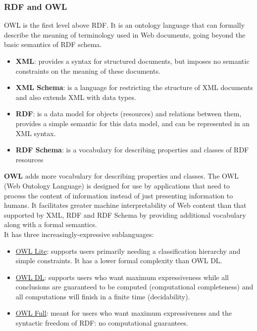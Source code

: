 \documentclass[10pt,a4paper]{article}
\begin{document}
\subsubsection{RDF and OWL}
OWL is the first level above RDF. It is an ontology language that can formally describe the meaning of terminology used in Web documents, going beyond the basic semantics of RDF schema.
\begin{itemize}
	\item \textbf{XML}: provides a syntax for structured documents, but imposes no semantic constraints on the meaning of these documents.
	\item \textbf{XML Schema}: is a language for restricting the structure of XML documents and also extends XML with data types.
	\item \textbf{RDF}: is a data model for objects (resources) and relations between them, provides a simple semantic for this data model, and can be represented in an XML syntax.
	\item \textbf{RDF Schema}: is a vocabulary for describing properties and classes of RDF resources
\end{itemize}
\textbf{OWL} adds more vocabulary for describing properties and classes. The OWL (Web Ontology Language) is designed for use by applications that need to process the content of information instead of just presenting information to humans. It facilitates greater machine interpretability of Web content than that supported by XML, RDF and RDF Schema by providing additional vocabulary along with a formal semantics.\\
	It has three increasingly-expressive sublanguages:
	\begin{itemize}
		\item \uline{OWL Lite}: supports users primarily needing a classification hierarchy and simple constraints. It has a lower formal complexity than OWL DL.
		\item \uline{OWL DL}: supports users who want maximum expressiveness while all conclusions are guaranteed to be computed (computational completeness) and all computations will finish in a finite time (decidability).
		\item \uline{OWL Full}: meant for users who want maximum expressiveness and the syntactic freedom of RDF: no computational guarantees.
	\end{itemize}
\end{document}
